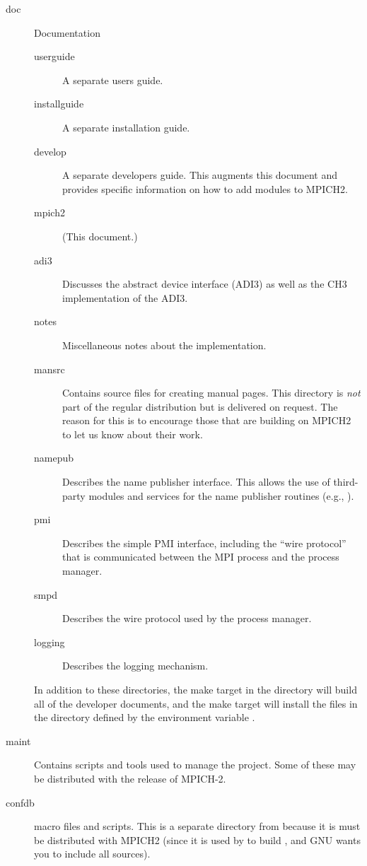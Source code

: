 \documentclass{article}
\begin{document}
\begin{description}
\item[doc]Documentation
  \begin{description}
    \item[userguide]A separate users guide.  
    \item[installguide]A separate installation guide.  
    \item[develop]A separate developers guide.  This augments this
    document and provides specific information on how to add modules
    to MPICH2.
    \item[mpich2] (This document.)
    \item[adi3]Discusses the abstract device interface (ADI3) as well
    as the CH3 implementation of the ADI3.
    \item[notes]Miscellaneous notes about the implementation.
    \item[mansrc]Contains source files for creating manual pages.  This 
    directory is \emph{not} part of the regular distribution but is delivered 
    on request.  The reason for this is to encourage those that are
    building on MPICH2 to let us know about their work.
    \item[namepub]Describes the name publisher interface.  This allows
    the use of third-party modules and services for the name publisher
    routines (e.g., ).  
    \item[pmi]Describes the simple PMI interface, including the ``wire
    protocol'' that is communicated between the MPI process and the
    process manager.
    \item[smpd]Describes the wire protocol used by the 
    process manager.
    \item[logging]Describes the  logging mechanism.
  \end{description}
  In addition to these directories, the make target  in
  the  directory will build all of the developer documents,
  and the make target  will install the files in
  the directory defined by the environment variable
  . 

\item[maint]
  Contains scripts and tools used to manage the project.  Some of these may be
  distributed with the release of MPICH-2.

\item[confdb] macro files and scripts.  This is a
separate directory from  because it is must be distributed
with MPICH2 (since it is used by  to build
, and GNU wants you to include all sources).


\end{description}
\end{document}
